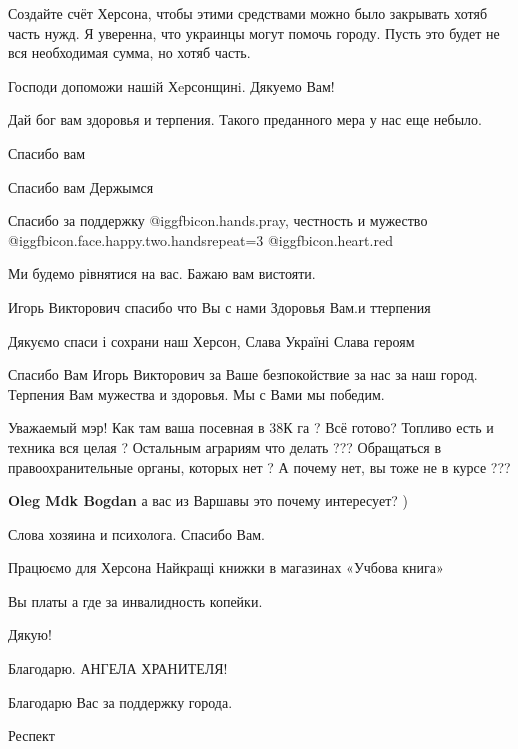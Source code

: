 \begin{itemize}

Создайте счёт Херсона, чтобы этими средствами можно было закрывать хотяб часть
нужд. Я уверенна, что украинцы могут помочь городу. Пусть это будет не вся
необходимая сумма, но хотяб часть.

Господи допоможи нашiй Хeрсонщинi. Дякуемо Вам!

Дай бог вам здоровья и терпения. Такого преданного мера у нас еще небыло.

Спасибо вам

Спасибо вам
Держымся

Спасибо за поддержку  @igg{fbicon.hands.pray}, честность и мужество @igg{fbicon.face.happy.two.hands}{repeat=3} @igg{fbicon.heart.red}

Ми будемо рівнятися на вас. Бажаю вам вистояти.

Игорь Викторович спасибо что Вы с нами Здоровья Вам.и ттерпения

Дякуємо спаси і сохрани наш Херсон, Слава Україні Слава героям


Спасибо Вам Игорь Викторович за Ваше безпокойствие за нас за наш город.
Терпения Вам мужества и здоровья. Мы с Вами мы победим.


Уважаемый мэр! Как там ваша посевная в 38К га ? Всё готово? Топливо есть и
техника вся целая ? Остальным аграриям что делать ??? Обращаться в
правоохранительные органы, которых нет ? А почему нет, вы тоже не в курсе ???

\textbf{Oleg Mdk Bogdan} а вас из Варшавы это почему интересует? )

Слова хозяина и психолога. Спасибо Вам.

Працюємо для Херсона
Найкращі книжки в магазинах «Учбова книга»

Вы платы а где за инвалидность копейки.

Дякую!

Благодарю. АНГЕЛА ХРАНИТЕЛЯ!

Благодарю Вас за поддержку города.

Респект


\end{itemize}
